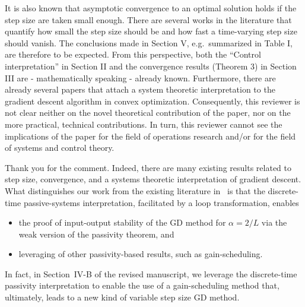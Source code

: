 \begin{rebuttal}[resolved]
    {%
        It is also known that asymptotic convergence to an optimal solution holds if the step size are taken small enough. There are several works in the literature that quantify how small the step size should be and how fast a time-varying step size should vanish. The conclusions made in Section V, e.g.\ summarized in Table I,  are therefore to be expected. From this perspective, both the ``Control interpretation'' in Section II  and the convergence results (Theorem 3) in Section III are - mathematically speaking - already known. Furthermore, there are already several papers that attach a system theoretic interpretation to the gradient descent algorithm in convex optimization. Consequently, this reviewer is not clear neither on the novel theoretical contribution of the paper, nor on the more practical, technical contributions. In turn, this reviewer cannot see the implications of the paper for the field of operations research and/or for the field of systems and control theory.
    }%
    {%
        Thank you for the comment. Indeed, there are many existing results related to step size, convergence, and a systems theoretic interpretation of gradient descent. What distinguishes our work from the existing literature in~\cite{ugrinovskii,alex_petersen,hu_lessard,lessard_dissipativity,lessard_recht_iqc,seiler_iqc,simpson} is that the discrete-time passive-systems interpretation, facilitated by a loop transformation, enables 
        \begin{itemize}
            \item{%
                the proof of input-output stability of the GD method for \(\alpha = 2/L\) via the weak version of the passivity theorem, and
            }%
            \item{%
                leveraging of other passivity-based results, such as gain-scheduling.
            }%
        \end{itemize}
        In fact, in Section~IV-B of the revised manuscript, we leverage the discrete-time passivity interpretation to enable the use of a gain-scheduling method that, ultimately, leads to a new kind of variable step size GD method.
    }%
\end{rebuttal}
